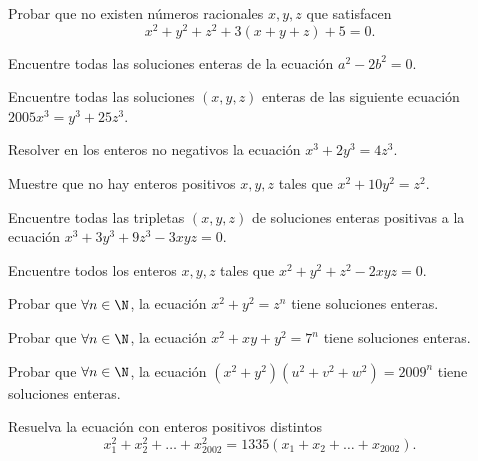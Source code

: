 \begin{exercise}
    Probar que no existen números racionales $x,y,z$ que satisfacen
    \[
        x^2+ y^2 + z^2 + 3(x+y+z) + 5 = 0.
    \]
\end{exercise}



\begin{problem}
    Encuentre todas las soluciones enteras de la ecuación $a^2-2b^2=0$.
\end{problem}

\begin{problem}
    Encuentre todas las soluciones $(x,y,z)$  enteras de las siguiente ecuación $2005x^3=y^3+25z^3$.
\end{problem}

\begin{problem}
    Resolver en los enteros no negativos la ecuación $x^3+2y^3=4z^3$.
\end{problem}

\begin{problem}
    Muestre que no hay enteros positivos $x,y,z$ tales que $x^2+10y^2=z^2$.
\end{problem}

\begin{problem}
    Encuentre todas las tripletas $(x,y,z)$ de soluciones enteras positivas a la ecuación $x^3 + 3y^3 + 9z^3 - 3xyz = 0$.
\end{problem}

\begin{problem}
    Encuentre todos los enteros $x,y,z$ tales que $x^2+y^2+z^2-2xyz=0$.
\end{problem}


\begin{problem}
    Probar que $\forall n \in \N$, la ecuación $x^2+y^2 = z^n$ tiene soluciones enteras.
\end{problem}

\begin{problem}
    Probar que $\forall n \in \N$, la ecuación $x^2+xy+y^2 = 7^n$ tiene soluciones enteras.
\end{problem}

\begin{problem}
    Probar que $\forall n \in \N$, la ecuación $(x^2 + y^2)(u^2 + v^2 + w^2) = 2009^n$ tiene soluciones enteras.
\end{problem}

\begin{problem}
    Resuelva la ecuación con enteros positivos distintos
    \[
        x_1^2 + x_2^2 + \dots + x_{2002}^2 = 1335\left(x_1 + x_2 + \dots + x_{2002}\right).
    \]
\end{problem}